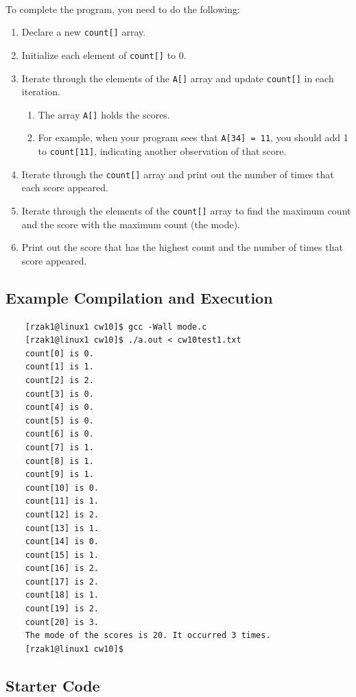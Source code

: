 \documentclass[letter,11pt]{article}
\begin{document}
\paragraph{}To complete the program, you need to do the following:
\begin{enumerate}
    \item Declare a new \texttt{count[]} array.
    \item Initialize each element of \texttt{count[]} to 0.
    \item Iterate through the elements of the \texttt{A[]} array and update \texttt{count[]} in each iteration.
    \begin{enumerate}
        \item The array \texttt{A[]} holds the scores.
        \item For example, when your program sees that \texttt{A[34] = 11}, you should add 1 to \texttt{count[11]}, indicating another observation of that score.
    \end{enumerate}
    \item Iterate through the \texttt{count[]} array and print out the number of times that each score appeared.
    \item Iterate through the elements of the \texttt{count[]} array to find the maximum count and the score with the maximum count (the mode).
    \item Print out the score that has the highest count and the number of times that score appeared.
\end{enumerate}

\subsection*{Example Compilation and Execution}
\begin{verbatim}
    [rzak1@linux1 cw10]$ gcc -Wall mode.c
    [rzak1@linux1 cw10]$ ./a.out < cw10test1.txt
    count[0] is 0.
    count[1] is 1.
    count[2] is 2.
    count[3] is 0.
    count[4] is 0.
    count[5] is 0.
    count[6] is 0.
    count[7] is 1.
    count[8] is 1.
    count[9] is 1.
    count[10] is 0.
    count[11] is 1.
    count[12] is 2.
    count[13] is 1.
    count[14] is 0.
    count[15] is 1.
    count[16] is 2.
    count[17] is 2.
    count[18] is 1.
    count[19] is 2.
    count[20] is 3.
    The mode of the scores is 20. It occurred 3 times.
    [rzak1@linux1 cw10]$
\end{verbatim}

\subsection*{Starter Code}
\end{document}
